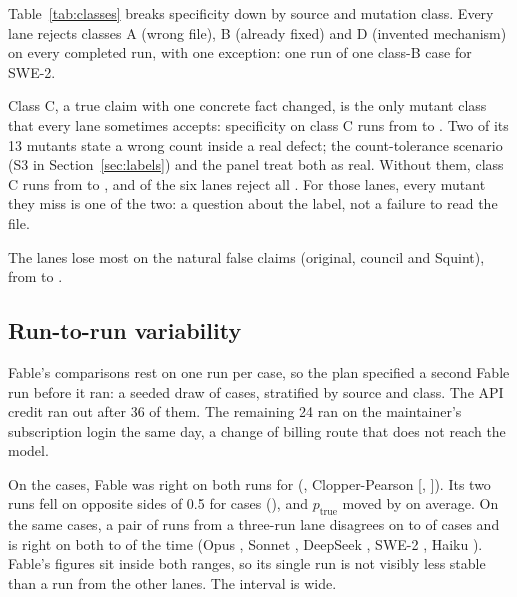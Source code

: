 \documentclass[11pt]{article}
\begin{document}
Table~\ref{tab:classes} breaks specificity down by source and mutation class. Every lane rejects classes A (wrong file), B (already fixed) and D (invented mechanism) on every completed run, with one exception: one run of one class-B case for SWE-2.

Class C, a true claim with one concrete fact changed, is the only mutant class that every lane sometimes accepts: specificity on class C runs from  to . Two of its 13 mutants state a wrong count inside a real defect; the count-tolerance scenario (S3 in Section~\ref{sec:labels}) and the panel treat both as real. Without them, class C runs from  to , and  of the six lanes reject all . For those lanes, every mutant they miss is one of the two: a question about the label, not a failure to read the file.

The lanes lose most on the natural false claims (original, council and Squint), from  to .

\begin{table}[h]
\centering\small

\caption{Specificity (mean case correctness) by false-claim source and mutation class.}
\label{tab:classes}
\end{table}

\subsection{Run-to-run variability}

Fable's comparisons rest on one run per case, so the plan specified a second Fable run before it ran: a seeded draw of  cases, stratified by source and class. The API credit ran out after 36 of them. The remaining 24 ran on the maintainer's subscription login the same day, a change of billing route that does not reach the model.

On the  cases, Fable was right on both runs for  (, Clopper-Pearson [, ]). Its two runs fell on opposite sides of 0.5 for  cases (), and $p_{\text{true}}$ moved by  on average. On the same cases, a pair of runs from a three-run lane disagrees on  to  of cases and is right on both  to  of the time (Opus , Sonnet , DeepSeek , SWE-2 , Haiku ). Fable's figures sit inside both ranges, so its single run is not visibly less stable than a run from the other lanes. The interval is wide.
\end{document}
